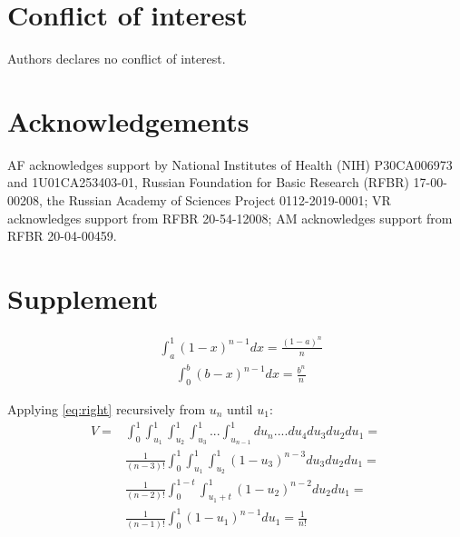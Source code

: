 \documentclass{llncs}
\begin{document}
\section{Conflict of interest}
Authors declares no conflict of interest.

\section{Acknowledgements}
AF acknowledges support by National Institutes of Health (NIH) P30CA006973 and 1U01CA253403-01, Russian Foundation for Basic Research (RFBR) 17-00-00208, the Russian Academy of Sciences Project 0112-2019-0001; VR acknowledges support from RFBR 20-54-12008; AM acknowledges support from RFBR 20-04-00459.





\newcommand{\beginsupplement}{%
        \setcounter{table}{0}
        \renewcommand{\thetable}{S\arabic{table}}%
        \setcounter{figure}{0}
        \renewcommand{\thefigure}{S\arabic{figure}}
        \setcounter{equation}{0}
        \renewcommand{\theequation}{S\arabic{equation}}%
     }
\section*{Supplement}
\beginsupplement

\begin{eqnarray}
&\displaystyle \int_a^1\left(1-x\right)^{n-1}dx=
\displaystyle \frac{\left(1-a\right)^n}{n}  \label{eq:right}
\end{eqnarray} 
\begin{eqnarray}
&\displaystyle \int_0^b\left(b-x\right)^{n-1}dx=\displaystyle \frac{b^n}{n}  \label{eq:left}
\end{eqnarray}

Applying \ref{eq:right} recursively from $u_n$ until $u_1$: 
\begin{eqnarray}
V = &\displaystyle \int_0^1\int_{u_1}^1\int_{u_2}^1\int_{u_3}^1...\int_{u_{n-1}}^1 du_n....du_4 du_3 du_2 du_1 = \nonumber \\ 
&\displaystyle \frac{1}{(n-3)!}\int_0^1\int_{u_1}^1\int_{u_2}^1 \left( 1-u_3 \right)^{n-3}du_3 du_2 du_1 = \nonumber \\
&\displaystyle \frac{1}{(n-2)!}\int_0^{1-t}\int_{{u_1}+t}^1\left( 1-u_2 \right)^{n-2} du_2 du_1 = \nonumber \\
&\displaystyle \frac{1}{(n-1)!} \int_0^1\left( 1-u_1 \right)^{n-1} du_1 = \frac{1}{n!} \label{eq:volume}
\end{eqnarray} 
\end{document}
